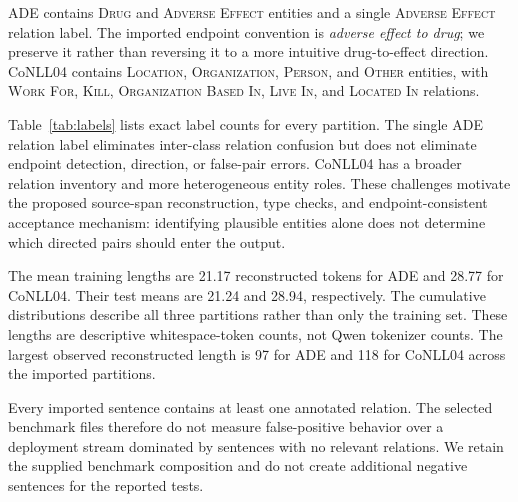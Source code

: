 \documentclass[a4paper,fleqn,numbers,doubleblind]{cas-dc}
\begin{document}
\begin{table}[t]
\centering\small\setlength{\tabcolsep}{4pt}
\caption{Dataset inventory for the exact experimental partitions. Length is
the number of whitespace-delimited tokens in the reconstructed source text.}
\label{tab:data}

\end{table}

ADE contains \textsc{Drug} and \textsc{Adverse Effect} entities and a single
\textsc{Adverse Effect} relation label. The imported endpoint convention is
\emph{adverse effect to drug}; we preserve it rather than reversing it to a
more intuitive drug-to-effect direction. CoNLL04 contains \textsc{Location},
\textsc{Organization}, \textsc{Person}, and \textsc{Other} entities, with
\textsc{Work For}, \textsc{Kill}, \textsc{Organization Based In},
\textsc{Live In}, and \textsc{Located In} relations.

Table~\ref{tab:labels} lists exact label counts for every partition. The single
ADE relation label eliminates inter-class relation confusion but does not
eliminate endpoint detection, direction, or false-pair errors. CoNLL04 has a
broader relation inventory and more heterogeneous entity roles. These
challenges motivate the proposed source-span reconstruction, type checks,
and endpoint-consistent acceptance mechanism: identifying plausible entities
alone does not determine which directed pairs should enter the output.

\begin{table}[t]
\centering\small\setlength{\tabcolsep}{4pt}
\caption{Exact entity and relation annotation counts in the imported files.}
\label{tab:labels}

\end{table}

The mean training lengths are 21.17 reconstructed tokens for ADE and 28.77 for
CoNLL04. Their test means are 21.24 and 28.94, respectively. The cumulative
distributions describe all three partitions rather than only the training set.
These lengths are descriptive whitespace-token counts, not Qwen tokenizer
counts. The largest observed reconstructed length is 97 for ADE and 118 for
CoNLL04 across the imported partitions.

Every imported sentence contains at least one annotated relation. The selected
benchmark files therefore do not measure false-positive behavior over a
deployment stream dominated by sentences with no relevant relations. We retain
the supplied benchmark composition and do not create additional negative
sentences for the reported tests.
\end{document}

